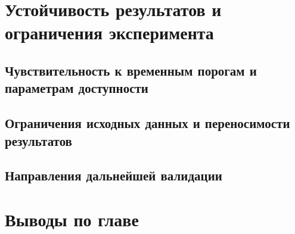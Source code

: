 \section{Устойчивость результатов и ограничения эксперимента}
\label{sec:robustness-limitations}

\subsection{Чувствительность к временным порогам и параметрам доступности}
\label{subsec:threshold-sensitivity}

\subsection{Ограничения исходных данных и переносимости результатов}
\label{subsec:data-limitations}

\subsection{Направления дальнейшей валидации}
\label{subsec:further-validation}

\section{Выводы по главе}
\label{sec:chapter4-conclusions}
